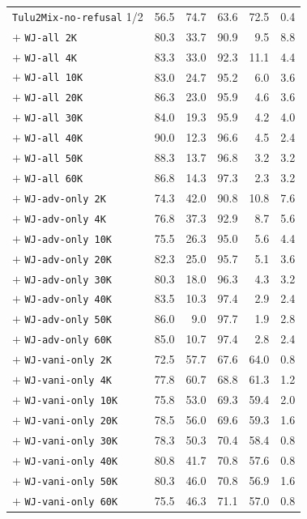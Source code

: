 \begin{table}[t!]
\begin{subtable}
{\begin{tabular}{l@{\hspace{0.6\tabcolsep}}
    r@{\hspace{0.95\tabcolsep}} 
    r@{\hspace{0.95\tabcolsep}}
    r@{\hspace{0.95\tabcolsep}}
    r@{\hspace{0.95\tabcolsep}}
    r
    }
\texttt{Tulu2Mix-no-refusal} 1/2 &56.5 & 74.7 & 63.6 & 72.5 & 0.4 \\
$+$ \texttt{WJ-all 2K}&80.3 & 33.7 & 90.9 & 9.5 & 8.8 \\
$+$ \texttt{WJ-all 4K}&83.3 & 33.0 & 92.3 & 11.1 & 4.4 \\
$+$ \texttt{WJ-all 10K}&83.0 & 24.7 & 95.2 & 6.0 & 3.6 \\
$+$ \texttt{WJ-all 20K}&86.3 & 23.0 & 95.9 & 4.6 & 3.6 \\
$+$ \texttt{WJ-all 30K}&84.0 & 19.3 & 95.9 & 4.2 & 4.0 \\
$+$ \texttt{WJ-all 40K}& 90.0 & 12.3 & 96.6 & 4.5 & 2.4 \\
$+$ \texttt{WJ-all 50K}& 88.3 & 13.7 & 96.8 & 3.2 & 3.2 \\
$+$ \texttt{WJ-all 60K}& 86.8 & 14.3 & 97.3 & 2.3 & 3.2 \\
$+$ \texttt{WJ-adv-only 2K}& 74.3 & 42.0 & 90.8 & 10.8 & 7.6 \\
$+$ \texttt{WJ-adv-only 4K}& 76.8 & 37.3 & 92.9 & 8.7 & 5.6 \\
$+$ \texttt{WJ-adv-only 10K}&75.5 & 26.3 & 95.0 & 5.6 & 4.4 \\
$+$ \texttt{WJ-adv-only 20K}&82.3 & 25.0 & 95.7 & 5.1 & 3.6 \\
$+$ \texttt{WJ-adv-only 30K}&80.3 & 18.0 & 96.3 & 4.3 & 3.2 \\
$+$ \texttt{WJ-adv-only 40K}&83.5 & 10.3 & 97.4 & 2.9 & 2.4 \\
$+$ \texttt{WJ-adv-only 50K}&86.0 & 9.0 & 97.7 & 1.9 & 2.8 \\
$+$ \texttt{WJ-adv-only 60K}&85.0 & 10.7 & 97.4 & 2.8 & 2.4 \\
$+$ \texttt{WJ-vani-only 2K}&72.5 & 57.7 & 67.6 & 64.0 & 0.8 \\
$+$ \texttt{WJ-vani-only 4K}&77.8 & 60.7 & 68.8 & 61.3 & 1.2 \\
$+$ \texttt{WJ-vani-only 10K}&75.8 & 53.0 & 69.3 & 59.4 & 2.0 \\
$+$ \texttt{WJ-vani-only 20K}&78.5 & 56.0 & 69.6 & 59.3 & 1.6 \\
$+$ \texttt{WJ-vani-only 30K}&78.3 & 50.3 & 70.4 & 58.4 & 0.8 \\
$+$ \texttt{WJ-vani-only 40K}&80.8 & 41.7 & 70.8 & 57.6 & 0.8 \\
$+$ \texttt{WJ-vani-only 50K}&80.3 & 46.0 & 70.8 & 56.9 & 1.6 \\
$+$ \texttt{WJ-vani-only 60K}&75.5 & 46.3 & 71.1 & 57.0 & 0.8 \\
         \bottomrule
    \end{tabular}}
    \end{subtable}
\end{table}
